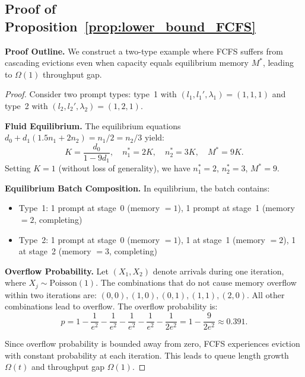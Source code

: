 \subsection{Proof of Proposition~\ref{prop:lower_bound_FCFS}}
\label{appendix:proof_fcfs_lower_bound}

\noindent\textbf{Proof Outline.} We construct a two-type example where FCFS suffers from cascading evictions even when capacity equals equilibrium memory $M^*$, leading to $\Omega(1)$ throughput gap.

\begin{proof}
Consider two prompt types: type~1 with $(l_1, l_1', \lambda_1) = (1, 1, 1)$ and type~2 with $(l_2, l_2', \lambda_2) = (1, 2, 1)$.

\textbf{Fluid Equilibrium.} The equilibrium equations $d_0 + d_1(1.5n_1 + 2n_2) = n_1/2 = n_2/3$ yield:
$$K = \frac{d_0}{1-9d_1}, \quad n_1^* = 2K, \quad n_2^* = 3K, \quad M^* = 9K.$$
Setting $K = 1$ (without loss of generality), we have $n_1^* = 2$, $n_2^* = 3$, $M^* = 9$.

\textbf{Equilibrium Batch Composition.} In equilibrium, the batch contains:
\begin{itemize}
\item Type~1: 1 prompt at stage~0 (memory $= 1$), 1 prompt at stage~1 (memory $= 2$, completing)
\item Type~2: 1 prompt at stage~0 (memory $= 1$), 1 at stage~1 (memory $= 2$), 1 at stage~2 (memory $= 3$, completing)
\end{itemize}

\textbf{Overflow Probability.} Let $(X_1, X_2)$ denote arrivals during one iteration, where $X_j \sim \text{Poisson}(1)$. The combinations that do not cause memory overflow within two iterations are: $(0,0), (1,0), (0,1), (1,1), (2,0)$. All other combinations lead to overflow. The overflow probability is:
$$p = 1 - \frac{1}{e^2} - \frac{1}{e^2} - \frac{1}{e^2} - \frac{1}{e^2} - \frac{1}{2e^2} = 1 - \frac{9}{2e^2} \approx 0.391.$$

Since overflow probability is bounded away from zero, FCFS experiences eviction with constant probability at each iteration. This leads to queue length growth $\Omega(t)$ and throughput gap $\Omega(1)$.
\end{proof}


